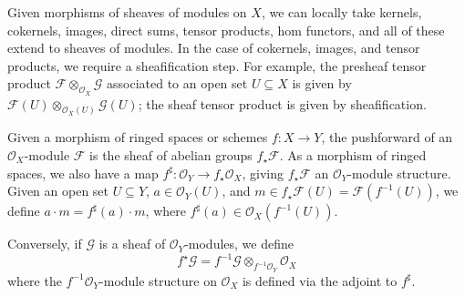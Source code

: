 Given morphisms of sheaves of modules on \( X \), we can locally take kernels, cokernels, images, direct sums, tensor products, hom functors, and all of these extend to sheaves of modules.
In the case of cokernels, images, and tensor products, we require a sheafification step.
For example, the presheaf tensor product \( \mathcal F \otimes_{\mathcal O_X} \mathcal G \) associated to an open set \( U \subseteq X \) is given by \( \mathcal F(U) \otimes_{\mathcal O_X(U)} \mathcal G(U) \); the sheaf tensor product is given by sheafification.

Given a morphism of ringed spaces or schemes \( f : X \to Y \), the pushforward of an \( \mathcal O_X \)-module \( \mathcal F \) is the sheaf of abelian groups \( f_\star \mathcal F \).
As a morphism of ringed spaces, we also have a map \( f^\sharp : \mathcal O_Y \to f_\star \mathcal O_X \), giving \( f_\star \mathcal F \) an \( \mathcal O_Y \)-module structure.
Given an open set \( U \subseteq Y \), \( a \in \mathcal O_Y(U) \), and \( m \in f_\star \mathcal F(U) = \mathcal F(f^{-1}(U)) \), we define \( a \cdot m = f^\sharp(a) \cdot m \), where \( f^\sharp(a) \in \mathcal O_X(f^{-1}(U)) \).

Conversely, if \( \mathcal G \) is a sheaf of \( \mathcal O_Y \)-modules, we define
\[ f^\star \mathcal G = f^{-1} \mathcal G \otimes_{f^{-1} \mathcal O_Y} \mathcal O_X \]
where the \( f^{-1} \mathcal O_Y \)-module structure on \( \mathcal O_X \) is defined via the adjoint to \( f^\sharp \).

